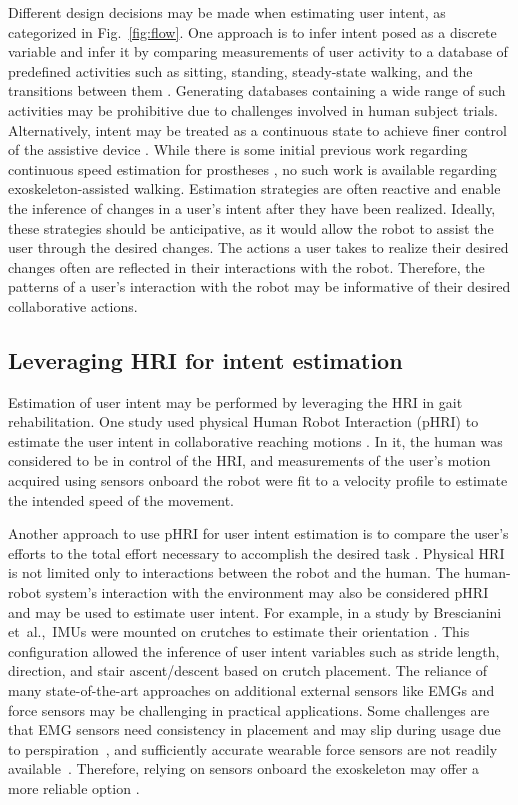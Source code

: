 Different design decisions may be made when estimating user intent, as categorized in Fig.~\ref{fig:flow}. One approach is to infer intent posed as a discrete variable and infer it by comparing measurements of user activity to a database of predefined activities such as sitting, standing, steady-state walking, and the transitions between them \cite{shen2013motion}. Generating databases containing a wide range of such activities may be prohibitive due to challenges involved in human subject trials. Alternatively, intent may be treated as a continuous state to achieve finer control of the assistive device \cite{gambon2019characterizing, suzuki2007intention}. While there is some initial previous work regarding continuous speed estimation for prostheses \cite{best2021phase}, no such work is available regarding exoskeleton-assisted walking. Estimation strategies are often reactive and enable the inference of changes in a user's intent after they have been realized. Ideally, these strategies should be anticipative, as it would allow the robot to assist the user through the desired changes. The actions a user takes to realize their desired changes often are reflected in their interactions with the robot. Therefore, the patterns of a user's interaction with the robot may be informative of their desired collaborative actions.

\subsection{Leveraging HRI for intent estimation}\label{sec:HRI}

Estimation of user intent may be performed by leveraging the HRI in gait rehabilitation. One study used physical Human Robot Interaction (pHRI) to estimate the user intent in collaborative reaching motions  \cite{corteville2007human}. In it, the human was considered to be in control of the HRI, and measurements of the user's motion acquired using sensors onboard the robot were fit to a velocity profile to estimate the intended speed of the movement. 

Another approach to use pHRI for user intent estimation is to compare the user's efforts to the total effort necessary to accomplish the desired task \cite{pehlivan2015minimal}. Physical HRI is not limited only to interactions between the robot and the human. The human-robot system's interaction with the environment may also be considered pHRI and may be used to estimate user intent. For example, in a study by Brescianini \mbox{et al.,}~IMUs were mounted on crutches to estimate their orientation \cite{brescianini2011ins}. This configuration allowed the inference of user intent variables such as stride length, direction, and stair ascent/descent based on crutch placement. The reliance of many state-of-the-art approaches on additional external sensors like EMGs and force sensors may be challenging in practical applications. Some challenges are that EMG sensors need consistency in placement and may slip during usage due to perspiration~\mbox{\cite{tkach2010study,ison2014role}}, and sufficiently accurate wearable force sensors are not readily available~\cite{moolchandani2021design}. Therefore, relying on sensors onboard the exoskeleton may offer a more reliable option \cite{Gambon20b}. 

